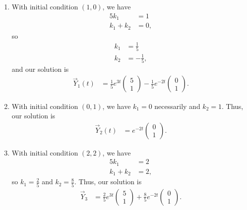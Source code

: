 \documentclass[10pt]{mypackage}
\begin{document}
\begin{enumerate}[(1)]
  \item With initial condition $\left(1,0\right)$, we have
    \begin{align*}
      5k_1 &= 1\\
      k_1 + k_2 &= 0,
    \end{align*}
    so
    \begin{align*}
      k_1 &= \frac{1}{5}\\
      k_2 &= -\frac{1}{5},
    \end{align*}
    and our solution is
    \begin{align*}
      \vec{Y}_1(t) &= \frac{1}{5}e^{3t} \begin{pmatrix}5\\1\end{pmatrix} - \frac{1}{5}e^{-2t} \begin{pmatrix}0\\1\end{pmatrix}.
    \end{align*}
  \item With initial condition $\left(0,1\right)$, we have $k_1 = 0$ necessarily and $k_2 = 1$. Thus, our solution is
    \begin{align*}
      \vec{Y}_2(t) &= e^{-2t} \begin{pmatrix}0\\1\end{pmatrix}.
    \end{align*}
  \item With initial condition $\left(2,2\right)$, we have
    \begin{align*}
      5k_1 &= 2\\
      k_1 + k_2 &= 2,
    \end{align*}
    so $k_1 = \frac{2}{5}$ and $k_2 = \frac{8}{5}$. Thus, our solution is
    \begin{align*}
      \vec{Y}_3 &= \frac{2}{5}e^{3t} \begin{pmatrix}5\\1\end{pmatrix} + \frac{8}{5} e^{-2t} \begin{pmatrix}0\\1\end{pmatrix}.
    \end{align*}
\end{enumerate}
\end{document}

